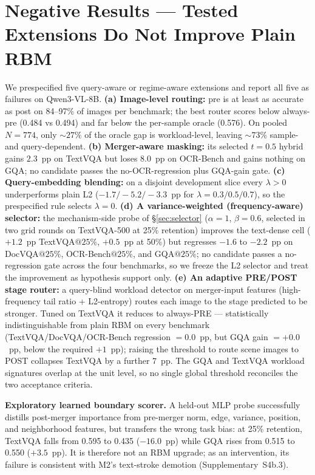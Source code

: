 \documentclass[sigconf,nonacm]{acmart}
\begin{document}
\section{Negative Results --- Tested Extensions Do Not Improve Plain RBM}\label{sec:negative}

We prespecified five query-aware or regime-aware extensions and
report all five as failures on Qwen3-VL-8B. \textbf{(a) Image-level routing:}
pre is at least as accurate as post on 84--97\% of images per benchmark; the
best router scores below always-pre (0.484 vs 0.494) and far below the
per-sample oracle (0.576). On pooled $N=774$, only ${\sim}27\%$ of the oracle
gap is workload-level, leaving ${\sim}73\%$ sample- and query-dependent.
\textbf{(b) Merger-aware masking:} its selected $t=0.5$ hybrid gains
$2.3$~pp on TextVQA but loses $8.0$~pp on OCR-Bench and gains nothing on GQA;
no candidate passes the no-OCR-regression plus GQA-gain gate.
\textbf{(c) Query-embedding blending:} on a disjoint development slice every
$\lambda>0$ underperforms plain L2 ($-1.7/-5.2/-3.3$~pp for
$\lambda=0.3/0.5/0.7$), so the prespecified rule selects $\lambda=0$.
\textbf{(d) A variance-weighted (frequency-aware) selector:} the mechanism-side
probe of \S\ref{sec:selector} ($\alpha{=}1$, $\beta{=}0.6$, selected in two grid
rounds on TextVQA-500 at 25\% retention) improves the text-dense cell
($+1.2$~pp TextVQA$@25\%$, $+0.5$~pp at 50\%) but regresses $-1.6$ to
$-2.2$~pp on DocVQA$@25\%$, OCR-Bench$@25\%$, and GQA$@25\%$; no candidate
passes a no-regression gate across the four benchmarks, so we freeze the L2
selector and treat the improvement as hypothesis support only.
\textbf{(e) An adaptive PRE/POST stage router:} a query-blind workload detector
on merger-input features (high-frequency tail ratio + L2-entropy) routes each
image to the stage predicted to be stronger. Tuned on TextVQA it reduces to
always-PRE --- statistically indistinguishable from plain RBM on every
benchmark (TextVQA/DocVQA/OCR-Bench regression $= 0.0$~pp, but GQA gain
$= +0.0$~pp, below the required $+1$~pp); raising the threshold to route
scene images to POST collapses TextVQA by a further $7$~pp. The GQA and TextVQA
workload signatures overlap at the unit level, so no single global threshold
reconciles the two acceptance criteria.

\textbf{Exploratory learned boundary scorer.} A held-out MLP probe successfully
distills post-merger importance from pre-merger norm, edge, variance, position,
and neighborhood features, but transfers the wrong task bias: at 25\%
retention, TextVQA falls from 0.595 to 0.435 ($-16.0$~pp) while GQA rises from
0.515 to 0.550 ($+3.5$~pp). It is therefore not an RBM upgrade; as an
intervention, its failure is consistent with M2's text-stroke demotion
(Supplementary~S4b.3).
\end{document}
